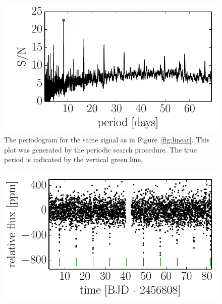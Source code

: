 \documentclass[12pt,preprint]{aastex}
\newcommand{\figref}[1]{\ref{fig:#1}}
\newcommand{\Fig}[1]{Figure~\figref{#1}}
\newcommand{\fig}[1]{\Fig{#1}}
\newcommand{\figlabel}[1]{\label{fig:#1}}
\begin{document}
\begin{figure}[p]
\begin{center}
\includegraphics{figures/periodic.pdf}
\end{center}
\caption{%
The periodogram for the same signal as in \fig{linear}.
This plot was generated by the periodic search procedure.
The true period is indicated by the vertical green line.
\figlabel{periodic}}
\end{figure}

\begin{figure}[p]
\begin{center}
\includegraphics{figures/de-trended.pdf}
\end{center}
\caption{%
\figlabel{de-trended}}
\end{figure}
\end{document}
